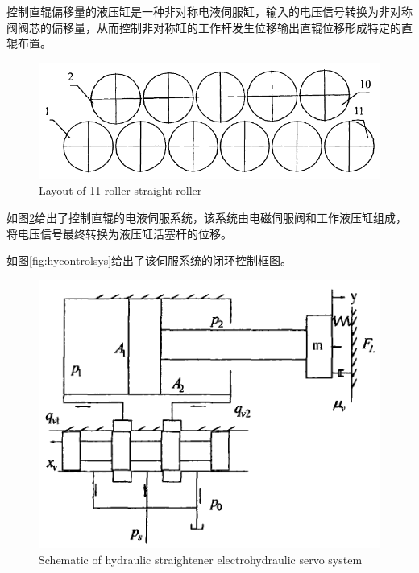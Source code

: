 控制直辊偏移量的液压缸是一种非对称电液伺服缸，输入的电压信号转换为非对称阀阀芯的偏移量，从而控制非对称缸的工作杆发生位移输出直辊位移形成特定的直辊布置。

\begin{figure}[!htp]
	\centering
	\includegraphics[width=\textwidth]{IMG/shiyigun.png}
		{Layout of 11 roller straight roller}
	\label{fig:shiyigun}
\end{figure}

如图\ref{fig:hyserver}给出了控制直辊的电液伺服系统，该系统由电磁伺服阀和工作液压缸组成，将电压信号最终转换为液压缸活塞杆的位移。

如图\ref{fig:hycontrolsys}给出了该伺服系统的闭环控制框图。

\begin{figure}[!htp]
	\centering
	\includegraphics[width=\textwidth]{IMG/hyserver.png}
		{Schematic of hydraulic straightener electrohydraulic servo system}
	\label{fig:hyserver}
\end{figure}

